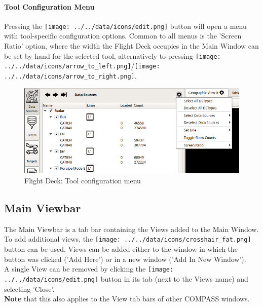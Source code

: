 \paragraph{Tool Configuration Menu} Pressing the \texttt{[image: ../../data/icons/edit.png]} button will 
open a menu with tool-specific configuration options. Common to all menus is the 'Screen Ratio' option, where the width the 
Flight Deck occupies in the Main Window can be set by hand for the selected tool, alternatively to pressing 
\texttt{[image: ../../data/icons/arrow\_to\_left.png]}/\texttt{[image: ../../data/icons/arrow\_to\_right.png]}.

\begin{figure}[H]
  \hspace*{-2.5cm}
  \center
  \includegraphics[width=12cm]{figures/ui_flight_deck_config.png}
  \caption{Flight Deck: Tool configuration menu}
\end{figure}

\subsection{Main Viewbar}
\label{sec:ui_main_view_bar}

The Main Viewbar is a tab bar containing the Views added to the Main Window. \\

To add additional views, the \texttt{[image: ../../data/icons/crosshair\_fat.png]} button can be used. 
Views can be added either to the window in which the button was clicked ('Add Here') or in a new window ('Add In New Window'). \\

A single View can be removed by clicking the \texttt{[image: ../../data/icons/edit.png]} button in its tab (next to the Views name) and selecting 'Close'. \\

\textbf{Note} that this also applies to the View tab bars of other COMPASS windows. \\

